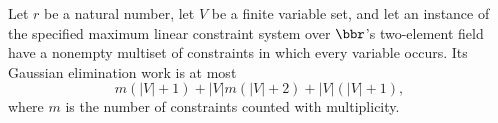 \begin{theorem}
\label{FABL.CSPInstance.gaussianEliminationWork_le}
\leanok
{}
Let $r$ be a natural number, let $V$ be a finite variable set, and let an instance of
the specified maximum linear constraint system over $\bbr$'s two-element field have a
nonempty multiset of constraints in which every variable occurs. Its Gaussian
elimination work is at most
\[m(|V|+1)+|V|m(|V|+2)+|V|(|V|+1),\]
where $m$ is the number of constraints counted with multiplicity.
\end{theorem}

